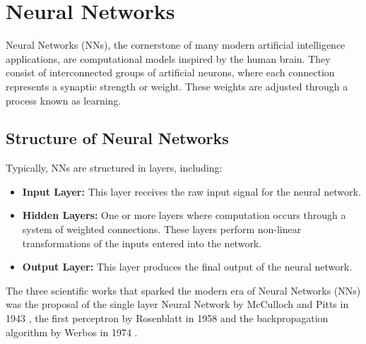 


\section{Neural Networks}
Neural Networks (NNs), the cornerstone of many modern artificial intelligence applications, are computational models inspired by the human brain. They consist of interconnected groups of artificial neurons, where each connection represents a synaptic strength or weight. These weights are adjusted through a process known as learning. 



\subsection{Structure of Neural Networks}
Typically, NNs are structured in layers, including:
\begin{itemize}
    \item \textbf{Input Layer:} This layer receives the raw input signal for the neural network.
    \item \textbf{Hidden Layers:} One or more layers where computation occurs through a system of weighted connections. These layers perform non-linear transformations of the inputs entered into the network.
    \item \textbf{Output Layer:} This layer produces the final output of the neural network.
\end{itemize}

The three scientific works that sparked the modern era of Neural Networks (NNs) was the proposal of the single layer Neural Network by McCulloch and Pitts in 1943 \cite{logcalc}, the first perceptron by Rosenblatt in 1958 \cite{perceptron} and the backpropagation algorithm by Werbos in 1974 \cite{backprop}.


